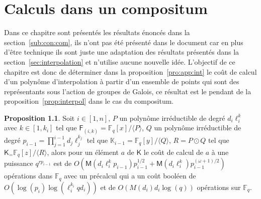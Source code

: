 \documentclass[10pt,a4paper]{book}
\theoremstyle{plain}
\theoremstyle{definition}
\theoremstyle{definition}
\theoremstyle{definition}
\newtheorem{prop}[thm]{Proposition}
\theoremstyle{definition}
\theoremstyle{remark}
\theoremstyle{remark}
\theoremstyle{definition}
\begin{document}
\chapter{Calculs dans un compositum}
\label{cha:ann:comp}
Dans ce chapitre sont présentés les résultats énoncés dans la 
section~\ref{sub:con:com}, ils n'ont pas été présenté dans le document car en 
plus d'être technique ils sont juste une adaptation des résultats présentés 
dans la section~\ref{sec:interpolation} et n'utilise aucune nouvelle idée. 
L'objectif de ce chapitre est donc de déterminer dans la 
proposition~\ref{pro:app:int} le coût de calcul d'un polynôme d'interpolation à
partir d'un ensemble de points qui sont des représentants sous l'action de 
groupes de Galois, ce résultat est le pendant de la 
proposition~\ref{prop:interpol} dans le cas du compositum.
\begin{prop}

Soit $i \in [1,n]$, $P$ un polynôme irréductible de degré $d_i\ell_i^{k}$ avec 
$k \in [1,k_i]$ tel que $\mathsf{F}_{(i,k)}=\mathbb{F}_q[x]/\langle P \rangle$,
$Q$ un polynôme irréductible de degré $p_{i-1}=\prod_{j=1}^{i-1}d_j\ell_j^{k_j}$
tel que $\mathbb{K}_{i-1}=\mathbb{F}_q[y]/\langle Q \rangle$, $R=P \odot Q$ 
tel que  $\mathsf{K}_=\mathbb{F}_q[z]/\langle R\rangle$, alors pour un 
élément $a$ de $\mathsf{K}$ le coût de calcul de $a$ à une puissance 
$q^{r p_{i-1}}$ est de 
$O(\mathsf{M}(d_i\ell_i^{k}p_{i-1})p_{i-1}^{1/2}+\mathsf{M}(d_i\ell_i^{k})p_{i-1}^{(\omega+1)/2})$ 
opérations dans $\mathbb{F}_q$ avec un 
précalcul qui a un coût booléen de $O(\log(p_{i})\log(\ell_i^{k_i}qd_i))$ et  
de $O( M(d_i) d_i\log(q))$ opérations sur $\mathbb{F}_q$.
\end{prop}
\end{document}
